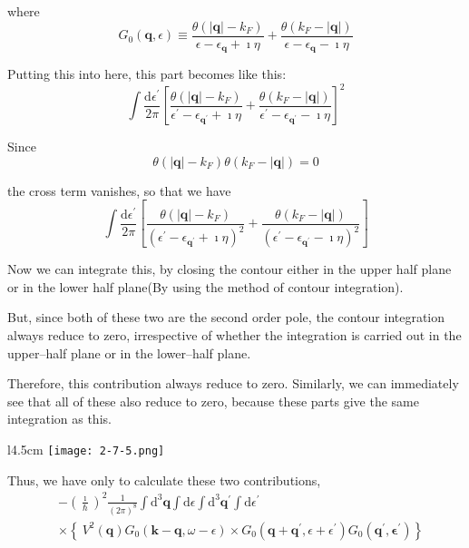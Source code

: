 where
\[ G_0(\mathbf{q},\epsilon) \equiv \frac{\theta(|\mathbf{q}|-k_F)}{\epsilon - \epsilon_{\mathbf{q}}+\imath \eta} + \frac{\theta(k_F-|\mathbf{q}|)}{\epsilon - \epsilon_{\mathbf{q}}-\imath \eta} \]

Putting this into here, this part becomes like this:
\[ \int \frac{\mathrm{d}\epsilon^{'}}{2\pi} \left[ \frac{\theta(|\mathbf{q}|-k_F)}{\epsilon^{'} - \epsilon_{\mathbf{q}^{'}}+\imath \eta} + \frac{\theta(k_F-|\mathbf{q}|)}{\epsilon^{'} - \epsilon_{\mathbf{q}^{'}}-\imath \eta} \right]^2 \]

Since $$\theta(|\mathbf{q}|-k_F)\theta(k_F-|\mathbf{q}|) = 0$$

 the cross term vanishes, so that we have
\[ \int \frac{\mathrm{d}\epsilon^{'}}{2\pi} \left[ \frac{\theta(|\mathbf{q}|-k_F)}{\left(\epsilon^{'} - \epsilon_{\mathbf{q}^{'}}+\imath \eta\right)^2} + \frac{\theta(k_F-|\mathbf{q}|)}{\left(\epsilon^{'} - \epsilon_{\mathbf{q}^{'}}-\imath \eta\right)^2} \right] \]

Now we can integrate this, by closing the contour either in the upper half plane or in the lower half plane(By using the method of contour integration).

But, since both of these two are the second order pole, the contour integration always reduce to zero, irrespective of whether the integration is carried out in the upper--half plane or in the lower--half plane.

Therefore, this contribution always reduce to zero. Similarly, we can immediately see that all of these also reduce to zero, because these parts give the same integration as this.

\begin{wrapfigure}[8]{l}{4.5cm}
\label{Fig2.7.5} \texttt{[image: 2-7-5.png]}
\end{wrapfigure}
Thus, we have only to calculate these two contributions,
\[ \begin{split} &- \left( \frac{\imath}{\hbar}\right)^2 \frac{1}{\left( 2\pi \right)^8} \int \mathrm{d}^3 \mathbf{q} \int \mathrm{d}\epsilon \int \mathrm{d}^3 \mathbf{q}^{'} \int \mathrm{d} \epsilon^{'} \\
&\times \left\{ \ V^2(\mathbf{q})G_0(\mathbf{k}-\mathbf{q},\omega-\epsilon) \times G_0(\mathbf{q} + \mathbf{q}^{'}, \epsilon + \epsilon^{'}) G_0(\mathbf{q}^{'},\mathbf{\epsilon}^{'}) \right\} \end{split} \]


